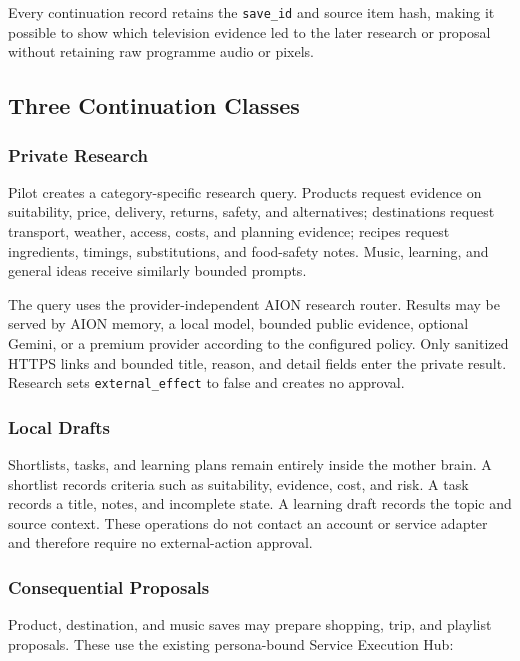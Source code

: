 Every continuation record retains the \texttt{save\_id} and source item hash,
making it possible to show which television evidence led to the later research
or proposal without retaining raw programme audio or pixels.

\subsection{Three Continuation Classes}

\subsubsection{Private Research}

Pilot creates a category-specific research query.  Products request evidence on
suitability, price, delivery, returns, safety, and alternatives; destinations
request transport, weather, access, costs, and planning evidence; recipes request
ingredients, timings, substitutions, and food-safety notes.  Music, learning,
and general ideas receive similarly bounded prompts.

The query uses the provider-independent AION research router.  Results may be
served by AION memory, a local model, bounded public evidence, optional Gemini,
or a premium provider according to the configured policy.  Only sanitized HTTPS
links and bounded title, reason, and detail fields enter the private result.
Research sets \texttt{external\_effect} to false and creates no approval.

\subsubsection{Local Drafts}

Shortlists, tasks, and learning plans remain entirely inside the mother brain.
A shortlist records criteria such as suitability, evidence, cost, and risk.  A
task records a title, notes, and incomplete state.  A learning draft records the
topic and source context.  These operations do not contact an account or service
adapter and therefore require no external-action approval.

\subsubsection{Consequential Proposals}

Product, destination, and music saves may prepare shopping, trip, and playlist
proposals.  These use the existing persona-bound Service Execution Hub:

